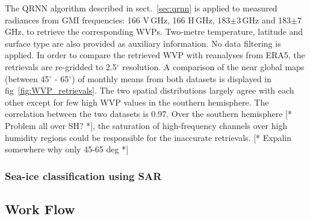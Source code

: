 \documentclass[12pt,oneside,a4paper]{article}
\newcommand\intodo[1]{{\color{red} [* #1 *]}}
\begin{document}
The QRNN algorithm described in sect.~\ref{sec:qrnn} is applied to measured
radiances from GMI frequencies: 166 V\,GHz, 166 H\,GHz, 183$\pm$3\,GHz and
183$\pm$7\,GHz, to retrieve the corresponding WVPs. Two-metre temperature,
latitude and surface type are also provided as auxiliary information. No data
filtering is applied. In order to compare the retrieved WVP with reanalyses
from ERA5, the retrievals are re-gridded to 2.5$^{\circ}$ resolution. A
comparison of the near global maps (between 45$^\circ$ - 65$^\circ$) of monthly
means from both datasets is displayed in fig~\ref{fig:WVP_retrievals}. The two
spatial distributions largely agree with each other except for few high WVP
values in the southern hemisphere. The correlation between the two datasets is
0.97. Over the southern hemisphere\intodo{Problem all over SH?}, the saturation
of high-frequency channels over high humidity regions could be responsible for
the inaccurate retrievals. \intodo{Expalin somewhere why only 45-65 deg}


\subsubsection{Sea-ice classification using SAR}



\subsection{Work Flow}
\label{sec:wp}
\end{document}
